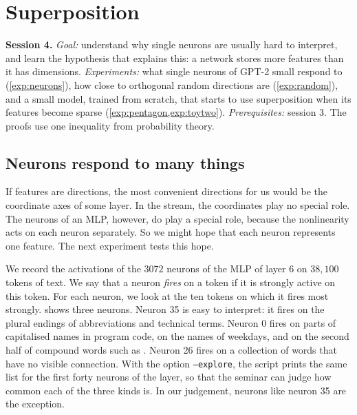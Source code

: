 \section{Superposition}
\label{sec:superposition}

\begin{sessioncard}
\textbf{Session 4.} \emph{Goal:} understand why single neurons are usually hard to interpret, and learn the
hypothesis that explains this: a network stores more features than it has dimensions.
\emph{Experiments:} what single neurons of GPT-2 small respond to (\cref{exp:neurons}), how close to orthogonal
random directions are (\cref{exp:random}), and a small model, trained from scratch, that starts to use
superposition when its features become sparse (\cref{exp:pentagon,exp:toytwo}).
\emph{Prerequisites:} session 3. The proofs use one inequality from probability theory.
\end{sessioncard}

\subsection{Neurons respond to many things}

If features are directions, the most convenient directions for us would be the coordinate axes of some layer.
In the stream, the coordinates play no special role. The neurons of an MLP, however, do play a special role,
because the nonlinearity acts on each neuron separately. So we might hope that each neuron represents one feature.
The next experiment tests this hope.

\begin{experiment}\label{exp:neurons} 
We record the activations of the $3072$ neurons of the MLP of layer 6 on $38{,}100$ tokens of text. We say that
a neuron \emph{fires} on a token if it is strongly active on this token. For each neuron, we look at the ten tokens
on which it fires most strongly.  shows three neurons. Neuron 35 is easy to interpret: it fires
on the plural endings of abbreviations and technical terms. Neuron 0 fires on parts of capitalised names in program
code, on the names of weekdays, and on the second half of compound words such as . Neuron 26 fires on
a collection of words that have no visible connection. With the option \texttt{--explore}, the script prints the
same list for the first forty neurons of the layer, so that the seminar can judge how common each of the three
kinds is. In our judgement, neurons like neuron 35 are the exception.
\end{experiment}

